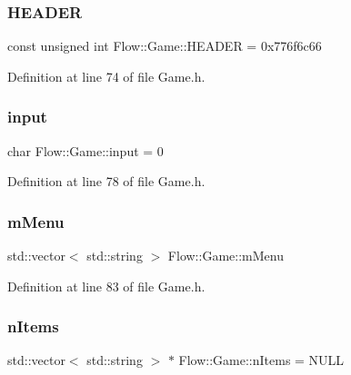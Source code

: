 \subsubsection{\texorpdfstring{H\+E\+A\+D\+ER}{HEADER}}
{\footnotesize\ttfamily const unsigned int Flow\+::\+Game\+::\+H\+E\+A\+D\+ER = 0x776f6c66\hspace{0.3cm}{\ttfamily [static]}}



Definition at line 74 of file Game.\+h.

\hypertarget{struct_flow_1_1_game_a4438db527125bb587f7d2a55ea0c4cec}{}\label{struct_flow_1_1_game_a4438db527125bb587f7d2a55ea0c4cec} 
\subsubsection{\texorpdfstring{input}{input}}
{\footnotesize\ttfamily char Flow\+::\+Game\+::input = 0\hspace{0.3cm}{\ttfamily [static]}}



Definition at line 78 of file Game.\+h.

\hypertarget{struct_flow_1_1_game_a02e4c98f7e94142c26a0d45068abfbf3}{}\label{struct_flow_1_1_game_a02e4c98f7e94142c26a0d45068abfbf3} 
\subsubsection{\texorpdfstring{m\+Menu}{mMenu}}
{\footnotesize\ttfamily std\+::vector$<$ std\+::string $>$ Flow\+::\+Game\+::m\+Menu\hspace{0.3cm}{\ttfamily [static]}}



Definition at line 83 of file Game.\+h.

\hypertarget{struct_flow_1_1_game_a722e065ecf907576f0b569a242464861}{}\label{struct_flow_1_1_game_a722e065ecf907576f0b569a242464861} 
\subsubsection{\texorpdfstring{n\+Items}{nItems}}
{\footnotesize\ttfamily std\+::vector$<$ std\+::string $>$ $\ast$ Flow\+::\+Game\+::n\+Items = N\+U\+LL\hspace{0.3cm}{\ttfamily [static]}}



